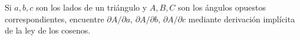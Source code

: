 \item Si $a, b, c$ son los lados de un triángulo y $A, B, C$ son los ángulos opuestos correspondientes, encuentre $\partial A / \partial a$, $\partial A / \partial b$, $\partial A / \partial c$ mediante derivación implícita de la ley de los cosenos.
